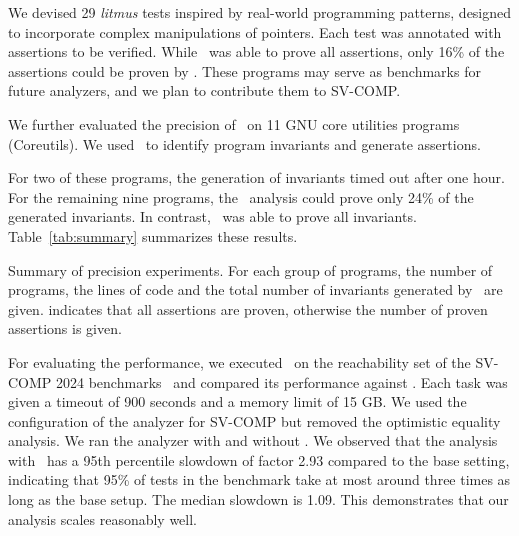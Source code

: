 We devised 29 \emph{litmus} tests inspired by real-world programming patterns,
designed to incorporate complex manipulations of pointers.
Each test was annotated with assertions to be verified.
While \cpo\ was able to prove all assertions,
only 16\% of the assertions could be proven by \base.
These programs may serve as benchmarks for future analyzers,
and we plan to contribute them to SV-COMP.

We further evaluated the precision of \cpo\ on 11 GNU core utilities programs (Coreutils).
We used \cpo\ to identify program invariants and generate assertions.
For two of these programs, the generation of invariants timed out after one hour. %
For the remaining nine programs, the \base\ analysis could prove only 24\% of the generated invariants.
In contrast, \cpo\ was able to prove all invariants.
%
Table~\ref{tab:summary} summarizes these results.

\begin{table}[t]
    \centering
    \caption{Summary of precision experiments. For each group of programs, the number of programs, the lines of code and the total number of invariants generated by \cpo\ are given.
         indicates that all assertions are proven, otherwise the number of proven assertions is given.}
    \label{tab:summary}
    
\end{table}

For evaluating the performance, we executed \cpo\ on the reachability set
of the SV-COMP 2024 benchmarks~\cite{Beyer24} and compared its performance against \base.
Each task was given a timeout of 900 seconds and a memory limit of 15 GB.\@
We used the configuration of the analyzer for SV-COMP but removed the optimistic equality analysis.
We ran the analyzer with and without \cpo.
We observed that the analysis with \cpo\ has a 95th percentile slowdown of factor 2.93 compared to the base setting,
indicating that 95\% of tests in the benchmark take at most around three times as long as the base setup.
The median slowdown is 1.09.
This demonstrates that our analysis scales reasonably well.


